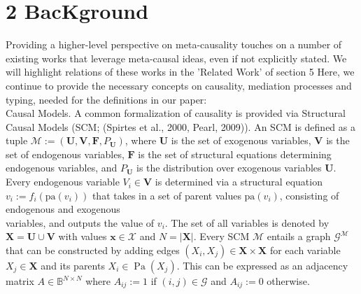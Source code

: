 \documentclass[10pt]{article}
\begin{document}
\section*{2 BacKground}
Providing a higher-level perspective on meta-causality touches on a number of existing works that leverage meta-causal ideas, even if not explicitly stated. We will highlight relations of these works in the 'Related Work' of section 5 Here, we continue to provide the necessary concepts on causality, mediation processes and typing, needed for the definitions in our paper:\\
Causal Models. A common formalization of causality is provided via Structural Causal Models (SCM; (Spirtes et al., 2000, Pearl, 2009)). An SCM is defined as a tuple $\mathcal{M}:=\left(\mathbf{U}, \mathbf{V}, \mathbf{F}, P_{\mathbf{U}}\right)$, where $\mathbf{U}$ is the set of exogenous variables, $\mathbf{V}$ is the set of endogenous variables, $\mathbf{F}$ is the set of structural equations determining endogenous variables, and $P_{\mathbf{U}}$ is the distribution over exogenous variables $\mathbf{U}$. Every endogenous variable $V_{i} \in \mathbf{V}$ is determined via a structural equation $v_{i}:=f_{i}\left(\mathrm{pa}\left(v_{i}\right)\right)$ that takes in a set of parent values $\mathrm{pa}\left(v_{i}\right)$, consisting of endogenous and exogenous\\
variables, and outputs the value of $v_{i}$. The set of all variables is denoted by $\mathbf{X}=\mathbf{U} \cup \mathbf{V}$ with values $\mathbf{x} \in \mathcal{X}$ and $N=|\mathbf{X}|$. Every SCM $\mathcal{M}$ entails a graph $\mathcal{G}^{\mathcal{M}}$ that can be constructed by adding edges $\left(X_{i}, X_{j}\right) \in \mathbf{X} \times \mathbf{X}$ for each variable $X_{j} \in \mathbf{X}$ and its parents $X_{i} \in \operatorname{Pa}\left(X_{j}\right)$. This can be expressed as an adjacency matrix $A \in \mathbb{B}^{N \times N}$ where $A_{i j}:=1$ if $(i, j) \in \mathcal{G}$ and $A_{i j}:=0$ otherwise.\\
\end{document}
